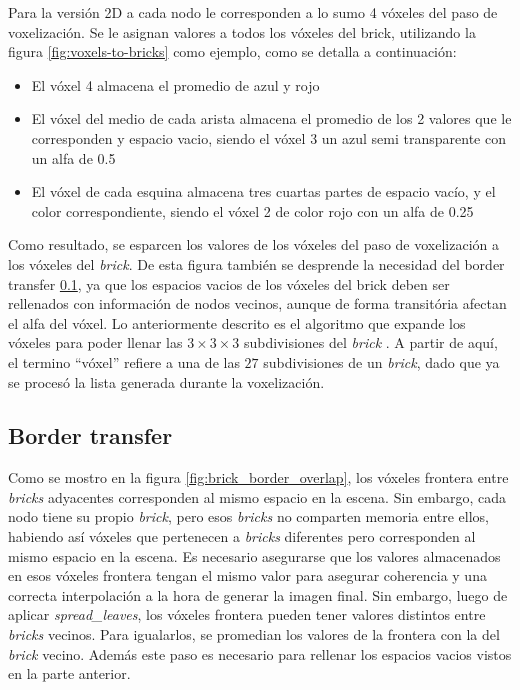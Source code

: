 Para la versión 2D a cada nodo le corresponden a lo sumo 4 vóxeles del paso de voxelización.
Se le asignan valores a todos los vóxeles del brick, utilizando la figura \ref{fig:voxels-to-bricks} como ejemplo, como se detalla a continuación:
\begin{itemize}
    \item El vóxel 4 almacena el promedio de azul y rojo
    \item El vóxel del medio de cada arista almacena el promedio de los 2 valores que le corresponden y espacio vacio, siendo el vóxel 3 un azul semi transparente con un alfa de 0.5
    \item El vóxel de cada esquina almacena tres cuartas partes de espacio vacío, y el color correspondiente, siendo el vóxel 2 de color rojo con un alfa de 0.25
\end{itemize}

Como resultado, se esparcen los valores de los vóxeles del paso de voxelización a los vóxeles del \textit{brick}.
De esta figura también se desprende la necesidad del border transfer \ref{sec:border_transfer}, ya que los espacios vacios de los vóxeles del brick deben ser rellenados con información de nodos vecinos, aunque de forma transitória afectan el alfa del vóxel.
Lo anteriormente descrito es el algoritmo que expande los vóxeles para poder llenar las $3\times3\times3$ subdivisiones del \textit{brick} .
A partir de aquí, el termino ``vóxel'' refiere a una de las $27$ subdivisiones de un \textit{brick}, dado que ya se procesó la lista generada durante la voxelización.

\subsection{Border transfer}\label{sec:border_transfer}

Como se mostro en la figura \ref{fig:brick_border_overlap}, los vóxeles frontera entre \textit{bricks} adyacentes corresponden al mismo espacio en la escena.
Sin embargo, cada nodo tiene su propio \textit{brick}, pero esos \textit{bricks} no comparten memoria entre ellos, habiendo así vóxeles que pertenecen a \textit{bricks} diferentes pero corresponden al mismo espacio en la escena.
Es necesario asegurarse que los valores almacenados en esos vóxeles frontera tengan el mismo valor para asegurar coherencia y una correcta interpolación a la hora de generar la imagen final.
Sin embargo, luego de aplicar \textit{spread\_leaves}, los vóxeles frontera pueden tener valores distintos entre \textit{bricks} vecinos.
Para igualarlos, se promedian los valores de la frontera con la del \textit{brick} vecino.
Además este paso es necesario para rellenar los espacios vacios vistos en la parte anterior.

